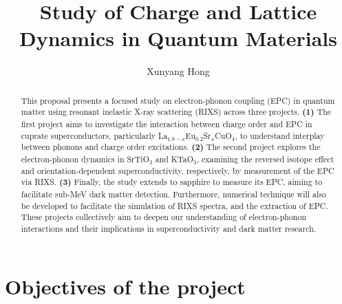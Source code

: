 \documentclass[11pt]{article}
\begin{document}
\title{Study of Charge and Lattice Dynamics in Quantum Materials}
\author{Xunyang Hong}
\date{}
\maketitle





\begin{abstract}
This proposal presents a focused study on electron-phonon coupling (EPC) in quantum matter using resonant inelastic X-ray scattering (RIXS) across three projects. \textbf{(1)} The first project aims to investigate the interaction between charge order and EPC in cuprate superconductors, particularly {La$_{1.8-x}$Eu$_{0.2}$Sr$_x$CuO$_{4}$}, to understand interplay between phonons and charge order excitations. \textbf{(2)} The second project explores the electron-phonon dynamics in SrTiO$_{3}$ and KTaO$_{3}$, examining the reversed isotope effect and orientation-dependent superconductivity, respectively, by measurement of the EPC via RIXS. \textbf{(3)} Finally, the study extends to sapphire to measure its EPC, aiming to facilitate sub-MeV dark matter detection.
Furthermore, numerical technique will also be developed to facilitate the simulation of RIXS spectra, and the extraction of EPC. These projects collectively aim to deepen our understanding of electron-phonon interactions and their implications in superconductivity and dark matter research.
\end{abstract}

\section{Objectives of the project}

\end{document}
